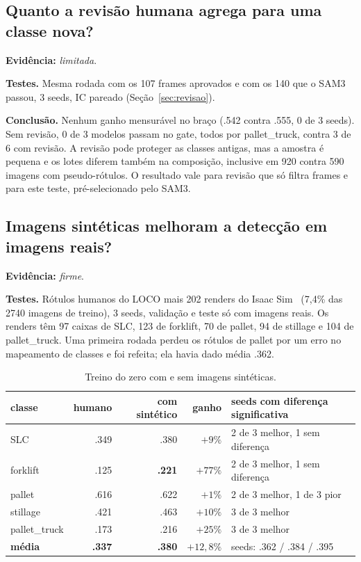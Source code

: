 \documentclass[11pt,a4paper]{article}
\newcommand{\evidencia}[1]{\noindent\textbf{Evidência:} \emph{#1}.\par}
\newcommand{\testes}{\noindent\textbf{Testes.} }
\newcommand{\conclusao}{\noindent\textbf{Conclusão.} }
\begin{document}
\subsection{Quanto a revisão humana agrega para uma classe nova?}
\evidencia{limitada}

\testes Mesma rodada com os 107 frames aprovados e com os 140 que o SAM3 passou,
3 seeds, IC pareado (Seção~\ref{sec:revisao}).

\conclusao Nenhum ganho mensurável no braço (.542 contra .555, 0 de 3 seeds). Sem
revisão, 0 de 3 modelos passam no gate, todos por pallet\_truck, contra 3 de 6 com
revisão. A revisão pode proteger as classes antigas, mas a amostra é pequena e
os lotes diferem também na composição, inclusive em 920 contra 590 imagens com
pseudo-rótulos. O resultado vale para revisão que só filtra frames e para este
teste, pré-selecionado pelo SAM3.

\subsection{Imagens sintéticas melhoram a detecção em imagens reais?}
\evidencia{firme}

\testes Rótulos humanos do LOCO mais 202 renders do Isaac Sim~\cite{isaac} (7,4\%
das 2740 imagens de treino), 3 seeds, validação e teste só com imagens reais. Os
renders têm 97 caixas de SLC, 123 de forklift, 70 de pallet, 94 de stillage e 104
de pallet\_truck. Uma primeira rodada perdeu os rótulos de pallet por um erro no
mapeamento de classes e foi refeita; ela havia dado média .362.

\begin{table}[H]
\centering\small
\caption{Treino do zero com e sem imagens sintéticas.}
\begin{tabular}{lrrrl}
\toprule
classe & humano & com sintético & ganho & seeds com diferença significativa \\
\midrule
SLC & .349 & .380 & $+9\%$ & 2 de 3 melhor, 1 sem diferença \\
forklift & .125 & \textbf{.221} & $+77\%$ & 2 de 3 melhor, 1 sem diferença \\
pallet & .616 & .622 & $+1\%$ & 2 de 3 melhor, 1 de 3 pior \\
stillage & .421 & .463 & $+10\%$ & 3 de 3 melhor \\
pallet\_truck & .173 & .216 & $+25\%$ & 3 de 3 melhor \\
\textbf{média} & \textbf{.337} & \textbf{.380} & $+12{,}8\%$ & seeds: .362 / .384 / .395 \\
\bottomrule
\end{tabular}
\end{table}
\end{document}
